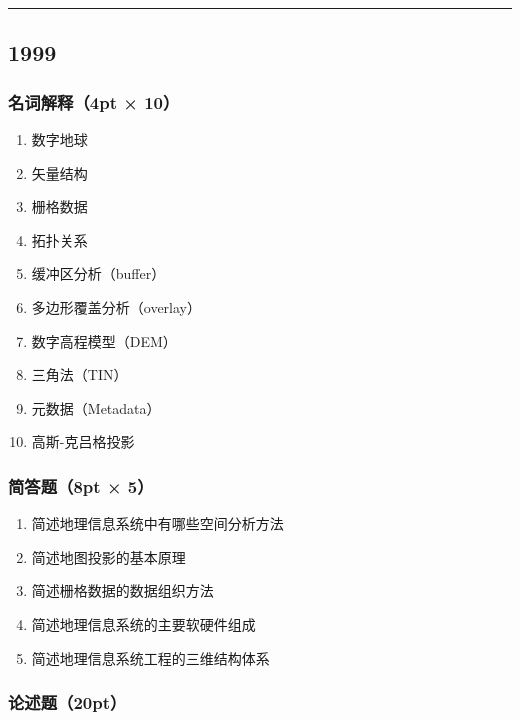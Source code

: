 \documentclass[]{article}
\begin{document}
\begin{center}\rule{0.5\linewidth}{\linethickness}\end{center}

\hypertarget{header-n32}{%
\subsection{1999}\label{header-n32}}

\hypertarget{header-n33}{%
\subsubsection{名词解释（4pt × 10）}\label{header-n33}}

\begin{enumerate}
\def\labelenumi{\arabic{enumi}.}
\item
  数字地球
\item
  矢量结构
\item
  栅格数据
\item
  拓扑关系
\item
  缓冲区分析（buffer）
\item
  多边形覆盖分析（overlay）
\item
  数字高程模型（DEM）
\item
  三角法（TIN）
\item
  元数据（Metadata）
\item
  高斯-克吕格投影
\end{enumerate}

\hypertarget{header-n55}{%
\subsubsection{简答题（8pt × 5）}\label{header-n55}}

\begin{enumerate}
\def\labelenumi{\arabic{enumi}.}
\item
  简述地理信息系统中有哪些空间分析方法
\item
  简述地图投影的基本原理
\item
  简述栅格数据的数据组织方法
\item
  简述地理信息系统的主要软硬件组成
\item
  简述地理信息系统工程的三维结构体系
\end{enumerate}

\hypertarget{header-n67}{%
\subsubsection{论述题（20pt）}\label{header-n67}}
\end{document}
